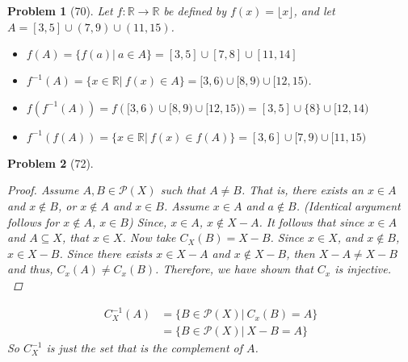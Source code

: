 \documentclass{article}
\theoremstyle{problem}
\newtheorem{prob}{Problem}
\theoremstyle{plain}
\theoremstyle{remark}
\begin{document}
\begin{prob}[70]
Let $f: \mathbb{R} \to \mathbb{R}$ be defined by $f(x) = \lfloor x \rfloor$, and let $A = [3,5] \cup (7,9) \cup (11,15)$.
\begin{itemize}
\item $f(A) = \{f(a)|\ a \in A\} = [3,5] \cup [7,8] \cup [11,14]$
\item $f^{-1}(A) = \{x \in \mathbb{R}|\ f(x) \in A\} = [3,6) \cup [8,9) \cup [12,15)$.
\item $f(f^{-1}(A)) = f([3,6) \cup [8,9) \cup [12,15)) = [3,5] \cup \{8\} \cup [12,14)$
\item $f^{-1}(f(A)) = \{x \in \mathbb{R}|\ f(x) \in f(A)\} = [3,6] \cup [7,9) \cup [11,15)$
\end{itemize}
\end{prob}

\begin{prob}[72]\ \\[-1cm]
\begin{proof}
  Assume $A,B \in \mathcal{P}(X)$ such that $A \not = B$. 
  That is, there exists an $x \in A$ and $x \not \in B$, or $x \not \in A$ and $x \in B$.
  Assume $x \in A$ and $a \not \in B$. (Identical argument follows for $x \not \in A$, $x \in B$)
  Since, $x \in A$, $x \not \in X - A$. 
  It follows that since $x \in A$ and $A \subseteq X$, that $x \in X$. 
  Now take $C_X(B) = X - B$. 
  Since $x \in X$, and $x \not \in B$, $x \in X - B$. 
  Since there exists $x \in X - A$ and $x \not \in X - B$, then $X - A \not = X - B$ and thus, $C_x(A) \not = C_x(B)$. Therefore, we have shown that $C_x$ is injective.\\
\end{proof}

\begin{align*}
  C_X^{-1}(A) &= \{B \in \mathcal{P}(X)|\ C_x(B) = A\}\\
  &= \{B \in \mathcal{P}(X)|\ X - B = A \}
\end{align*}
So $C^{-1}_X$ is just the set that is the complement of $A$.
\end{prob}
\end{document}

